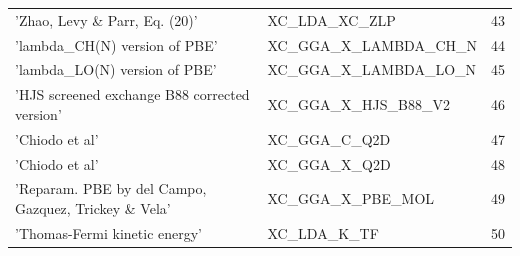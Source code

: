 \documentclass[final,12pt]{article}
\begin{document}
{{{{{{\begin{table}[!h]
\begin{center}
\begin{tabular}{llr}
  'Zhao, Levy \& Parr, Eq. (20)' & XC\_LDA\_XC\_ZLP  & 43\\
  'lambda\_CH(N) version of PBE' & XC\_GGA\_X\_LAMBDA\_CH\_N  & 44\\
  'lambda\_LO(N) version of PBE' & XC\_GGA\_X\_LAMBDA\_LO\_N  & 45\\
  'HJS screened exchange B88 corrected version' & XC\_GGA\_X\_HJS\_B88\_V2  & 46\\
  'Chiodo et al' & XC\_GGA\_C\_Q2D  & 47\\
  'Chiodo et al' & XC\_GGA\_X\_Q2D  & 48\\
  'Reparam. PBE by del Campo, Gazquez, Trickey \& Vela' & XC\_GGA\_X\_PBE\_MOL  & 49\\
  'Thomas-Fermi kinetic energy' & XC\_LDA\_K\_TF  & 50\\
\hline
\hline
\end{tabular}
\end{center}
\end{table}

}}}}}}
\end{document}
